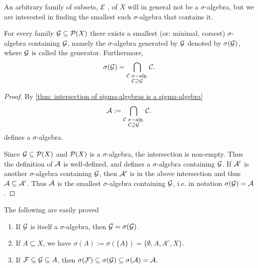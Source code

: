\documentclass[../../textbook.tex]{subfiles}
\begin{document}
An arbitrary family of subsets, $\mathcal{E}$ , of $X$ will in general not be a $\sigma$-algebra, but we are interested in finding the smallest such $\sigma$-algebra that contains it.

\begin{proposition}
For every family $\mathcal{G}\subseteq \mathcal{P}(X)$ there exists a smallest (or: minimal, corsest) $\sigma$-algebra containing $\mathcal{G}$, namely the $\sigma$-algebra generated by $\mathcal{G}$ denoted by $\sigma(\mathcal{G})$, where $\mathcal{G}$ is called the generator. Furthermore,
\begin{align*}
    \sigma(\mathcal{G})=\bigcap_{\substack{\mathcal{C} \; \sigma-\text{alg.} \\ \mathcal{C} \supseteq \mathcal{G}}} \mathcal{C}.
\end{align*}
\end{proposition}
\begin{proof}
By \cref{thm: intersection of sigma-algebras is a sigma-algebra}
\begin{align*}
    \mathcal{A}:=\bigcap_{\substack{\mathcal{C} \; \sigma-\text{alg.} \\ \mathcal{C} \supseteq \mathcal{G}}} \mathcal{C}.
\end{align*}
defines a $\sigma$-algebra.

Since $\mathcal{G}\subseteq \mathcal{P}(X)$ and $\mathcal{P}(X)$ is a $\sigma$-algebra, the intersection is non-empty. Thus the definition of $\mathcal{A}$ is well-defined, and defines a $\sigma$-algebra containing $\mathcal{G}$. If $\mathcal{A}'$ is another $\sigma$-algebra containing $\mathcal{G}$, then $\mathcal{A}'$ is in the above intersection and thus $\mathcal{A}\subseteq \mathcal{A}'$. Thus $\mathcal{A}$ is the smallest $\sigma$-algebra containing $\mathcal{G}$, i.e. in notation $\sigma(\mathcal{G})=\mathcal{A}$.
\end{proof}

\begin{remark}
The following are easily proved
\begin{enumerate}
    \item If $\mathcal{G}$ is itself a $\sigma$-algebra, then $\mathcal{G}=\sigma(\mathcal{G})$.
    \item If $A\subseteq X$, we have $\sigma(A):=\sigma(\{A\})=\{\emptyset, A, A^c, X\}$.
    \item If $\mathcal{F} \subseteq \mathcal{G} \subseteq A$, then $\sigma(\mathcal{F})\subseteq \sigma(\mathcal{G}) \subseteq \sigma(\mathcal{A})=\mathcal{A}$.
\end{enumerate}
\end{remark}
\end{document}
